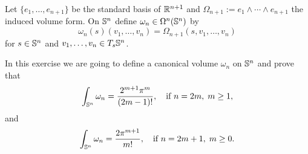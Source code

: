 \begin{exercise}
  Let $\{e_1,\ldots,e_{n+1}\}$ be the standard basis of $\mathbb{R}^{n+1}$ and $\Omega_{n+1} := e_1\wedge\cdots\wedge e_{n+1}$ the induced volume form.
  On $\mathbb{S}^n$ define $\omega_n\in\Omega^n(\mathbb{S}^n)$ by
  \begin{equation}
    \omega_n(s)(v_1, \ldots, v_n) = \Omega_{n+1}(s, v_1, \ldots, v_n)
  \end{equation}
  for $s\in\mathbb{S}^n$ and $v_1,\ldots,v_n\in T_s\mathbb{S}^n$.

  In this exercise we are going to define a canonical volume $\omega_n$ on $\mathbb{S}^n$ and prove that 
  \begin{equation}
    \int_{\mathbb{S}^n} \omega_n = \frac{2^{m+1}\pi^m}{(2m-1)!}, \quad\mbox{if } n=2m,\; m\geq 1,
  \end{equation}
  and
  \begin{equation}
    \int_{\mathbb{S}^n} \omega_n = \frac{2\pi^{m+1}}{m!}, \quad\mbox{if } n=2m+1,\; m\geq 0.
  \end{equation}


\end{exercise}
